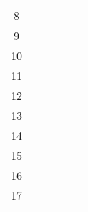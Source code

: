 \begin{table}[ht]
\begin{tabular}{c|lllll}
    8                        &                                          &                                           &                                                &                                    &                                      \\
    9                        &                                          &                                           &                                                &                                    &                                      \\
    10                       &                                          &                                           &                                                &                                    &                                      \\
    11                       &                                          &                                           &                                                &                                    &                                      \\
    12                       &                                          &                                           &                                                &                                    &                                      \\
    13                       &                                          &                                           &                                                &                                    &                                      \\
    14                       &                                          &                                           &                                                &                                    &                                      \\
    15                       &                                          &                                           &                                                &                                    &                                      \\
    16                       &                                          &                                           &                                                &                                    &                                      \\
    17                       &                                          &                                           &                                                &                                    &                                      \\

\end{tabular}
\end{table}
